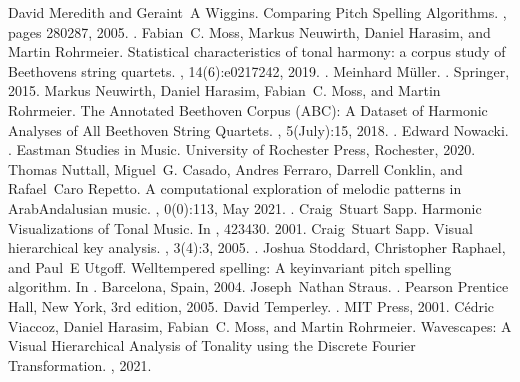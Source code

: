 \documentclass[letterpaper,10pt,english]{sphinxmanual}
\begin{document}
\begin{sphinxthebibliography}{10}
David Meredith and Geraint A Wiggins. Comparing Pitch Spelling Algorithms. , pages 280\textendash{}287, 2005. .
Fabian C. Moss, Markus Neuwirth, Daniel Harasim, and Martin Rohrmeier. Statistical characteristics of tonal harmony: a corpus study of Beethoven\textquotesingle{}s string quartets. , 14(6):e0217242, 2019. .
Meinhard Müller. . Springer, 2015.
Markus Neuwirth, Daniel Harasim, Fabian C. Moss, and Martin Rohrmeier. The Annotated Beethoven Corpus (ABC): A Dataset of Harmonic Analyses of All Beethoven String Quartets. , 5(July):1\textendash{}5, 2018. .
Edward Nowacki. . Eastman Studies in Music. University of Rochester Press, Rochester, 2020.
Thomas Nuttall, Miguel G. Casado, Andres Ferraro, Darrell Conklin, and Rafael Caro Repetto. A computational exploration of melodic patterns in Arab\sphinxhyphen{}Andalusian music. , 0(0):1\textendash{}13, May 2021. .
Craig Stuart Sapp. Harmonic Visualizations of Tonal Music. In , 423\textendash{}430. 2001.
Craig Stuart Sapp. Visual hierarchical key analysis. , 3(4):3, 2005. .
Joshua Stoddard, Christopher Raphael, and Paul E Utgoff. Well\sphinxhyphen{}tempered spelling: A key\sphinxhyphen{}invariant pitch spelling algorithm. In . Barcelona, Spain, 2004.
Joseph Nathan Straus. . Pearson Prentice Hall, New York, 3rd edition, 2005.
David Temperley. . MIT Press, 2001.
Cédric Viaccoz, Daniel Harasim, Fabian C. Moss, and Martin Rohrmeier. Wavescapes: A Visual Hierarchical Analysis of Tonality using the Discrete Fourier Transformation. , 2021.
\end{sphinxthebibliography}
\end{document}
